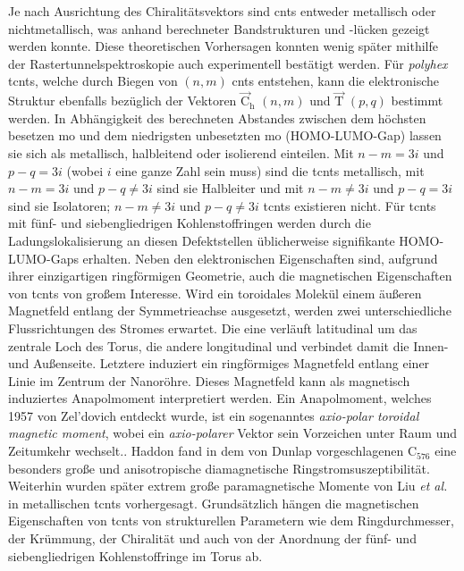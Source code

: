 Je nach Ausrichtung des Chiralitätsvektors sind \acp{cnt} entweder metallisch oder nichtmetallisch, was anhand berechneter Bandstrukturen und -lücken gezeigt werden konnte.\supercite{mintmire1992fullerene,hamada1992new,saito1992electronic,saito1998physical} Diese theoretischen Vorhersagen konnten wenig später mithilfe der Rastertunnelspektroskopie auch experimentell bestätigt werden.\supercite{wilder1998electronic} Für \textit{polyhex} \acp{tcnt}, welche durch Biegen von $(n,m)$ \acp{cnt} entstehen, kann die elektronische Struktur ebenfalls bezüglich der Vektoren $\vec{\text{C}}_\text{h}$ $(n,m)$ und $\vec{\text{T}}$ $(p,q)$ bestimmt werden.\supercite{ceulemans2000electronic} In Abhängigkeit des berechneten Abstandes zwischen dem höchsten besetzen \ac{mo} und dem niedrigsten unbesetzten \ac{mo} (HOMO-LUMO-Gap) lassen sie sich als metallisch, halbleitend oder isolierend einteilen. Mit $n-m=3i$ und $p-q=3i$ (wobei $i$ eine ganze Zahl sein muss) sind die \acp{tcnt} metallisch, mit $n-m=3i$ und $p-q\neq3i$ sind sie Halbleiter und mit $n-m\neq3i$ und $p-q=3i$ sind sie Isolatoren; $n-m\neq3i$ und $p-q\neq3i$ \acp{tcnt} existieren nicht.\supercite{zhang2005electronic} Für \acp{tcnt} mit fünf- und siebengliedrigen Kohlenstoffringen werden durch die Ladungslokalisierung an diesen Defektstellen üblicherweise signifikante HOMO-LUMO-Gaps erhalten.\supercite{meunier1998atomic,oh2000structures,yazgan2004electronic,wu2011density} Neben den elektronischen Eigenschaften sind, aufgrund ihrer einzigartigen ringförmigen Geometrie, auch die magnetischen Eigenschaften von \acp{tcnt} von großem Interesse. Wird ein toroidales Molekül einem äußeren Magnetfeld entlang der Symmetrieachse ausgesetzt, werden zwei unterschiedliche Flussrichtungen des Stromes erwartet.\supercite{sundholm2016calculations} Die eine verläuft latitudinal um das zentrale Loch des Torus, die andere longitudinal und verbindet damit die Innen- und Außenseite. Letztere induziert ein ringförmiges Magnetfeld entlang einer Linie im Zentrum der Nanoröhre. Dieses Magnetfeld kann als magnetisch induziertes Anapolmoment interpretiert werden.\supercite{berger2012prediction,ceulemans1998molecular,pelloni2011magnetic} Ein Anapolmoment, welches 1957 von Zel'dovich\supercite{zel1958electromagnetic} entdeckt wurde, ist ein sogenanntes \textit{axio-polar toroidal magnetic moment}\supercite{ascher1966some}, wobei ein \textit{axio-polarer} Vektor sein Vorzeichen unter Raum und Zeitumkehr wechselt.\supercite{schmid2001ferrotoroidics}. Haddon fand in dem von Dunlap vorgeschlagenen C$_{576}$ eine besonders große und anisotropische diamagnetische Ringstromsuszeptibilität.\supercite{haddon1997electronic} Weiterhin wurden später extrem große paramagnetische Momente von Liu \textit{et al.}\supercite{liu2002colossal} in metallischen \acp{tcnt} vorhergesagt. Grundsätzlich hängen die magnetischen Eigenschaften von \acp{tcnt} von strukturellen Parametern wie dem Ringdurchmesser, der Krümmung, der Chiralität und auch von der Anordnung der fünf- und siebengliedrigen Kohlenstoffringe im Torus ab.\supercite{tsai2004magnetization,liu2007magnetic,liu2008magnetic}\\

